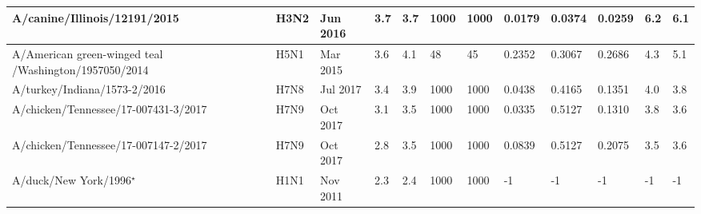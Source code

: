 \begin{tabular}{L{1.32in}|L{.35in}|L{.3in}|L{.3in}|L{.3in}|L{.35in}|L{.35in}|L{.35in}|L{.35in}|L{.32in}|L{.3in}|L{.3in}}
 A/canine/Illinois/12191/2015 &H3N2& Jun  2016 &3.7&3.7&1000&1000&0.0179&0.0374&0.0259&6.2&6.1\\\hline
 A/American  green-winged  teal /Washington/1957050/2014 &H5N1& Mar  2015 &3.6&4.1&48&45&0.2352&0.3067&0.2686&4.3&5.1\\\hline
 A/turkey/Indiana/1573-2/2016 &H7N8& Jul  2017 &3.4&3.9&1000&1000&0.0438&0.4165&0.1351&4.0&3.8\\\hline
 A/chicken/Tennessee/17-007431-3/2017 &H7N9& Oct  2017 &3.1&3.5&1000&1000&0.0335&0.5127&0.1310&3.8&3.6\\\hline
 A/chicken/Tennessee/17-007147-2/2017 &H7N9& Oct  2017 &2.8&3.5&1000&1000&0.0839&0.5127&0.2075&3.5&3.6\\\hline
 A/duck/New  York/1996$^\star$ &H1N1& Nov  2011 &2.3&2.4&1000&1000&-1&-1&-1&-1&-1\\\hline
\end{tabular}